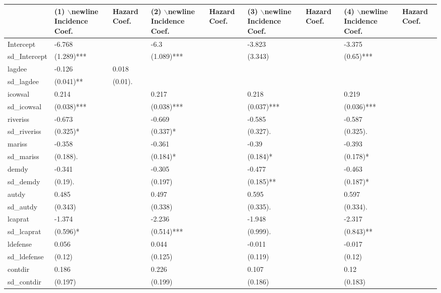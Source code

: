 \begin{table}[ht]
\centering
\begin{tabular}{lllllllll}
  \hline
  & (1) $\backslash$newline Incidence Coef. &  Hazard Coef. & (2) $\backslash$newline Incidence Coef. &  Hazard Coef. & (3) $\backslash$newline Incidence Coef. &  Hazard Coef. & (4) $\backslash$newline Incidence Coef. &  Hazard Coef. \\ 
  \hline
Intercept & -6.768 &  & -6.3 &  & -3.823 &  & -3.375 &  \\ 
  sd\_Intercept & (1.289)*** &  & (1.089)*** &  & (3.343)  &  & (0.65)*** &  \\ 
  lagdee & -0.126 & 0.018 &  &  &  &  &  &  \\ 
  sd\_lagdee & (0.041)** & (0.01). &  &  &  &  &  &  \\ 
  icowsal & 0.214 &  & 0.217 &  & 0.218 &  & 0.219 &  \\ 
  sd\_icowsal & (0.038)*** &  & (0.038)*** &  & (0.037)*** &  & (0.036)*** &  \\ 
  riveriss & -0.673 &  & -0.669 &  & -0.585 &  & -0.587 &  \\ 
  sd\_riveriss & (0.325)* &  & (0.337)* &  & (0.327). &  & (0.325). &  \\ 
  mariss & -0.358 &  & -0.361 &  & -0.39 &  & -0.393 &  \\ 
  sd\_mariss & (0.188). &  & (0.184)* &  & (0.184)* &  & (0.178)* &  \\ 
  demdy & -0.341 &  & -0.305 &  & -0.477 &  & -0.463 &  \\ 
  sd\_demdy & (0.19). &  & (0.197)  &  & (0.185)** &  & (0.187)* &  \\ 
  autdy & 0.485 &  & 0.497 &  & 0.595 &  & 0.597 &  \\ 
  sd\_autdy & (0.343)  &  & (0.338)  &  & (0.335). &  & (0.334). &  \\ 
  lcaprat & -1.374 &  & -2.236 &  & -1.948 &  & -2.317 &  \\ 
  sd\_lcaprat & (0.596)* &  & (0.514)*** &  & (0.999). &  & (0.843)** &  \\ 
  ldefense & 0.056 &  & 0.044 &  & -0.011 &  & -0.017 &  \\ 
  sd\_ldefense & (0.12)  &  & (0.125)  &  & (0.119)  &  & (0.12)  &  \\ 
  contdir & 0.186 &  & 0.226 &  & 0.107 &  & 0.12 &  \\ 
  sd\_contdir & (0.197)  &  & (0.199)  &  & (0.186)  &  & (0.183)  &  \\ 

\end{tabular}
\end{table}
